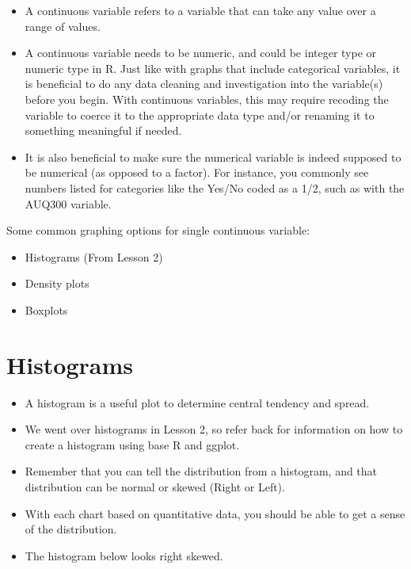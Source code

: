 \documentclass[
  letterpaper,
  DIV=11,
  numbers=noendperiod]{scrreprt}
\providecommand{\tightlist}{%
  \setlength{\itemsep}{0pt}\setlength{\parskip}{0pt}}\usepackage{longtable,booktabs,array}
\begin{document}
\begin{itemize}
\tightlist
\item
  A continuous variable refers to a variable that can take any value
  over a range of values.
\item
  A continuous variable needs to be numeric, and could be integer type
  or numeric type in R. Just like with graphs that include categorical
  variables, it is beneficial to do any data cleaning and investigation
  into the variable(s) before you begin. With continuous variables, this
  may require recoding the variable to coerce it to the appropriate data
  type and/or renaming it to something meaningful if needed.
\item
  It is also beneficial to make sure the numerical variable is indeed
  supposed to be numerical (as opposed to a factor). For instance, you
  commonly see numbers listed for categories like the Yes/No coded as a
  1/2, such as with the AUQ300 variable.
\end{itemize}

Some common graphing options for single continuous variable:

\begin{itemize}
\tightlist
\item
  Histograms (From Lesson 2)
\item
  Density plots
\item
  Boxplots
\end{itemize}

\section{Histograms}\label{histograms-1}

\begin{itemize}
\item
  A histogram is a useful plot to determine central tendency and spread.
\item
  We went over histograms in Lesson 2, so refer back for information on
  how to create a histogram using base R and ggplot.
\item
  Remember that you can tell the distribution from a histogram, and that
  distribution can be normal or skewed (Right or Left).\\
\item
  With each chart based on quantitative data, you should be able to get
  a sense of the distribution.
\item
  The histogram below looks right skewed.
\end{itemize}
\end{document}
